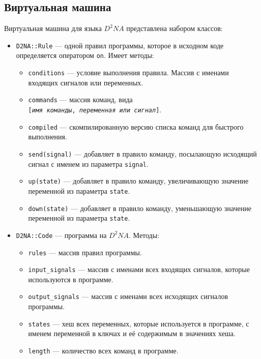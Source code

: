 \documentclass[utf8,a5paper,portrait,10pt,twoside]{eskdtext}
\begin{document}
\newpage
\subsection{Виртуальная машина}
Виртуальная машина для языка $D^2NA$ представлена набором классов:
\begin{itemize}
  \item \texttt{D2NA::Rule} — одной правил программы, которое в исходном коде
        определяется оператором \texttt{on}. Имеет методы:
        \begin{itemize}
          \item \texttt{conditions} — условие выполнения правила. Массив с
                именами входящих сигналов или переменных.
          \item \texttt{commands} — массив команд, вида\\
                \texttt{[\textit{имя команды}, \textit{переменная или сигнал}]}.
          \item \texttt{compiled} — скомпилированную версию списка команд для
                быстрого выполнения.
          \item \texttt{send(signal)} — добавляет в правило команду, посылающую
                исходящий сигнал с именем из параметра \texttt{signal}.
          \item \texttt{up(state)} — добавляет в правило команду, увеличивающую
                значение переменной из параметра \texttt{state}.
          \item \texttt{down(state)} — добавляет в правило команду, уменьшающую
                значение переменной из параметра \texttt{state}.
        \end{itemize}
  \newpage
  \item \texttt{D2NA::Code} — программа на $D^2NA$. Методы:
        \begin{itemize}
          \item \texttt{rules} — массив правил программы.
          \item \texttt{input\_signals} — массив с именами всех входящих
                сигналов, которые используются в программе.
          \item \texttt{output\_signals} — массив с именами всех исходящих
                сигналов программы.
          \item \texttt{states} — хеш всех переменных, которые используется
                в программе, с именем переменной в ключах и её содержимым в
                значениях хеша.
          \item \texttt{length} — количество всех команд в программе.

\end{itemize}
\end{itemize}
\end{document}
